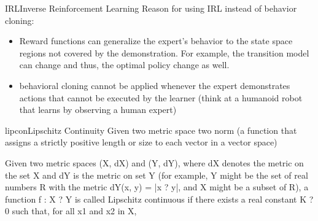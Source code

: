 \documentclass[9pt]{article}
\begin{document}
\begin{topic}{IRL}{Inverse Reinforcement Learning} 
Reason for using IRL instead of behavior cloning:
\begin{itemize}
\item Reward functions can generalize the expert's behavior to the state space regions not covered by the demonstration. For example, the transition model can change and thus, the optimal policy change as well. 
\item behavioral cloning cannot be applied whenever the expert demonstrates actions that cannot be executed by the
learner (think at a humanoid robot that learns by observing a human expert)
\end{itemize}
\end{topic}

\begin{topic}{lipcon}{Lipschitz Continuity}
Given two metric space two norm (a function that assigns  a strictly positive length or size to each vector in a vector space)

Given two metric spaces (X, dX) and (Y, dY), where dX denotes the metric on the set X and dY is the metric on set Y (for example, Y might be the set of real numbers R with the metric dY(x, y) = |x ? y|, and X might be a subset of R), a function f : X ? Y is called Lipschitz continuous if there exists a real constant K ? 0 such that, for all x1 and x2 in X,

\citep{Eriksson2013Applied}
\end{topic}
\end{document}
